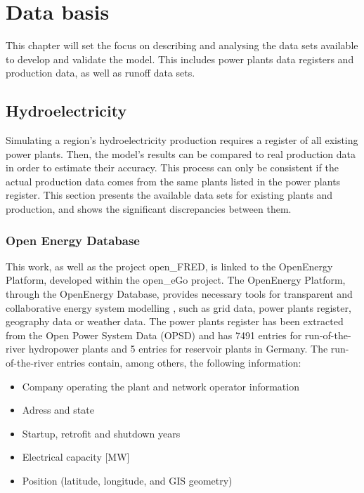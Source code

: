 \chapter{Data basis}
\label{chap:data_basis}

This chapter will set the focus on describing and analysing the data sets available to develop and validate the model. This includes power plants data registers and production data, as well as runoff data sets. 

\section{Hydroelectricity}
\label{sec:db_hydroelec}
Simulating a region's hydroelectricity production requires a register of all existing power plants. Then, the model's results can be compared to real production data in order to estimate their accuracy. This process can only be consistent if the actual production data comes from the same plants listed in the power plants register. This section presents the available data sets for existing plants and production, and shows the significant discrepancies between them. 

\subsection{Open Energy Database}
\label{sub:hpp_reg}
This work, as well as the project open\_FRED, is linked to the OpenEnergy Platform, developed within the open\_eGo project. The OpenEnergy Platform, through the OpenEnergy Database, provides necessary tools for transparent and collaborative energy system modelling \cite{oedb}, such as grid data, power plants register, geography data or weather data. The power plants register has been extracted from the Open Power System Data (OPSD) \cite{opsd} and has 7491 entries for run-of-the-river hydropower plants and 5 entries for reservoir plants in Germany. The run-of-the-river entries contain, among others, the following information:
\begin{itemize}
\itemsep-0.5em 
 \item Company operating the plant and network operator information
 \item Adress and state
 \item Startup, retrofit and shutdown years
 \item Electrical capacity [\unit{MW}]
 \item Position (latitude, longitude, and GIS geometry)
\end{itemize}

